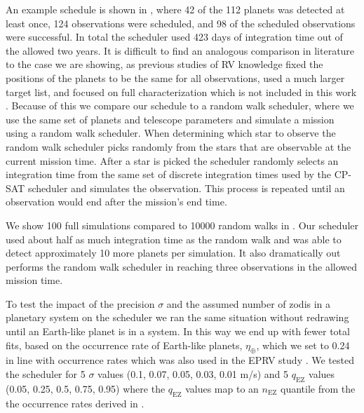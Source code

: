 An example schedule is shown in , where 42 of the 112
planets was detected at least once, 124 observations were scheduled, and 98 of
the scheduled observations were successful. In total the scheduler used 423
days of integration time out of the allowed two years. It is difficult to find
an analogous comparison in literature to the case we are showing, as previous
studies of RV knowledge fixed the positions of the planets to be the same for
all observations, used a much larger target list, and focused on full
characterization which is not included in this
work \citep{morganExplorationExpectedNumber2022a}. Because of this we compare
our schedule to a random walk scheduler, where we use the same set of planets
and telescope parameters and simulate a mission using a random walk scheduler. When determining
which star to observe the random walk scheduler picks randomly from the stars
that are observable at the current mission time. After a star is picked the
scheduler randomly selects an integration time from the same set of discrete
integration times used by the CP-SAT scheduler and simulates the observation.
This process is repeated until an observation would end after the mission's
end time.

We show 100 full simulations compared to 10000 random walks in 
. Our scheduler used about half as much integration
time as the random walk and was able to detect approximately 10 more planets
per simulation. It also dramatically out performs the random walk scheduler
in reaching three observations in the allowed mission time.

To test the impact of the precision $\sigma$ and the assumed number of zodis in
a planetary system on the scheduler we ran the same situation without redrawing
until an Earth-like planet is in a system. In this way we end up with fewer
total fits, based on the occurrence rate of Earth-like planets,
$\eta_{\oplus}$, which we set to 0.24 in line with
\citet{dulzJointRadialVelocity2020} occurrence rates which was also used in the
EPRV study \citep{morganExplorationExpectedNumber2022a}. We tested the
scheduler for 5 $\sigma$ values (0.1, 0.07, 0.05, 0.03, 0.01 m/s) and 5
$q_\textrm{EZ}$ values (0.05, 0.25, 0.5, 0.75, 0.95) where the $q_\textrm{EZ}$
values map to an $n_\textrm{EZ}$ quantile from the the occurrence rates derived
in \citet{ertelHOSTSSurvey2020}.

